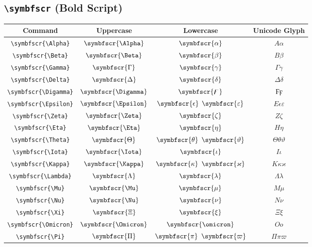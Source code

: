 \documentclass[12pt,a4paper]{article}
\begin{document}
\newpage

\subsection*{\texttt{\textbackslash{}symbfscr} (Bold Script)}

\begin{longtable}{|c|c|c|c|}
\hline
\textbf{Command} & \textbf{Uppercase} & \textbf{Lowercase} & \textbf{Unicode Glyph} \\
\hline
\verb|\symbfscr{\Alpha}| & $\symbfscr{\Alpha}$ & $\symbfscr{\alpha}$ & $ Α 𝛼 $ \\
\verb|\symbfscr{\Beta}| & $\symbfscr{\Beta}$ & $\symbfscr{\beta}$ & $ Β 𝛽 $ \\
\verb|\symbfscr{\Gamma}| & $\symbfscr{\Gamma}$ & $\symbfscr{\gamma}$ & $ Γ 𝛾 $ \\
\verb|\symbfscr{\Delta}| & $\symbfscr{\Delta}$ & $\symbfscr{\delta}$ & $ Δ 𝛿 $ \\
\verb|\symbfscr{\Digamma}| & $\symbfscr{\Digamma}$ & $\symbfscr{\digamma}$ & $ Ϝ ϝ $ \\
\verb|\symbfscr{\Epsilon}| & $\symbfscr{\Epsilon}$ & $\symbfscr{\epsilon}$ $\symbfscr{\varepsilon}$ & $ Ε 𝜖 𝜀 $ \\
\verb|\symbfscr{\Zeta}| & $\symbfscr{\Zeta}$ & $\symbfscr{\zeta}$ & $ Ζ 𝜁 $ \\
\verb|\symbfscr{\Eta}| & $\symbfscr{\Eta}$ & $\symbfscr{\eta}$ & $ Η 𝜂 $ \\
\verb|\symbfscr{\Theta}| & $\symbfscr{\Theta}$ & $\symbfscr{\theta}$ $\symbfscr{\vartheta}$ & $ Θ 𝜃 𝜗 $ \\
\verb|\symbfscr{\Iota}| & $\symbfscr{\Iota}$ & $\symbfscr{\iota}$ & $ Ι 𝜄 $ \\
\verb|\symbfscr{\Kappa}| & $\symbfscr{\Kappa}$ & $\symbfscr{\kappa}$ $\symbfscr{\varkappa}$ & $ Κ 𝜅 𝜘 $ \\
\verb|\symbfscr{\Lambda}| & $\symbfscr{\Lambda}$ & $\symbfscr{\lambda}$ & $ Λ 𝜆 $ \\
\verb|\symbfscr{\Mu}| & $\symbfscr{\Mu}$ & $\symbfscr{\mu}$ & $ Μ 𝜇 $ \\
\verb|\symbfscr{\Nu}| & $\symbfscr{\Nu}$ & $\symbfscr{\nu}$ & $ Ν 𝜈 $ \\
\verb|\symbfscr{\Xi}| & $\symbfscr{\Xi}$ & $\symbfscr{\xi}$ & $ Ξ 𝜉 $ \\
\verb|\symbfscr{\Omicron}| & $\symbfscr{\Omicron}$ & $\symbfscr{\omicron}$ & $ Ο 𝜊 $ \\
\verb|\symbfscr{\Pi}| & $\symbfscr{\Pi}$ & $\symbfscr{\pi}$ $\symbfscr{\varpi}$ & $ Π 𝜋 𝜛 $ \\

\end{longtable}
\end{document}
